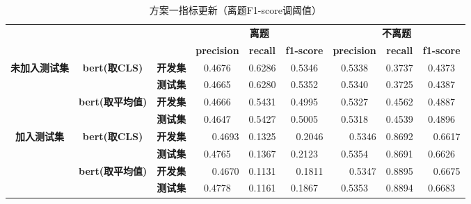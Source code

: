 \documentclass[11pt]{article}
\begin{document}
\begin{CJK}{UTF8}{gkai}
\begin{table}[htbp]\small
  \centering
  \begin{tabular}{c|cc|ccc|ccc}
    \hline
    \multicolumn{3}{c}{\multirow{2}[0]{*}{\textcolor[rgb]{ 1,  0,  0}{}}} & \multicolumn{3}{c}{\textbf{离题}} & \multicolumn{3}{c}{\textbf{不离题}} \\
    \multicolumn{3}{c}{}  & \textbf{precision} & \textbf{recall} & \textbf{f1-score} & \textbf{precision} & \textbf{recall} & \textbf{f1-score} \\
    \hline
    \multirow{4}[0]{*}{\textbf{未加入测试集}} & \multirow{2}[0]{*}{\textbf{bert(取CLS)}} & \textbf{开发集} & 0.4676  & 0.6286  & 0.5346  & 0.5338  & 0.3737  & 0.4373  \\
    &       & \textbf{测试集} & 0.4665  & 0.6280  & 0.5352  & 0.5340  & 0.3725  & 0.4387  \\
    \cline{2-9}
    & \multirow{2}[0]{*}{\textbf{bert(取平均值)}} & \textbf{开发集} & 0.4666  & 0.5431  & 0.4995  & 0.5327  & 0.4562  & 0.4887  \\
    &       & \textbf{测试集} & 0.4647  & 0.5427  & 0.5005  & 0.5318  & 0.4539  & 0.4896  \\
    \hline
    \multirow{4}[0]{*}{\textbf{加入测试集}} & \multirow{2}[0]{*}{\textbf{bert(取CLS)}} & \textbf{开发集} & \multicolumn{1}{r}{0.4693 } & \multicolumn{1}{r}{0.1325 } & \multicolumn{1}{r}{0.2046 } & \multicolumn{1}{r}{0.5346 } & \multicolumn{1}{r}{0.8692 } & \multicolumn{1}{r}{0.6617 } \\
    &       & \textbf{测试集} & 0.4765  & 0.1367  & 0.2123  & 0.5354  & 0.8691  & 0.6626  \\
    \cline{2-9}
    & \multirow{2}[0]{*}{\textbf{bert(取平均值)}} & \textbf{开发集} & \multicolumn{1}{r}{0.4670 } & \multicolumn{1}{r}{0.1131 } & \multicolumn{1}{r}{0.1811 } & \multicolumn{1}{r}{0.5347 } & \multicolumn{1}{r}{0.8895 } & \multicolumn{1}{r}{0.6675 } \\
    &       & \textbf{测试集} & 0.4778  & 0.1161  & 0.1867  & 0.5353  & 0.8894  & 0.6683  \\
    \hline
    \end{tabular}%
  \caption{方案一指标更新（离题F1-score调阈值）}

  \label{tab:addlabel}%
\end{table}%


\end{CJK}
\end{document}
